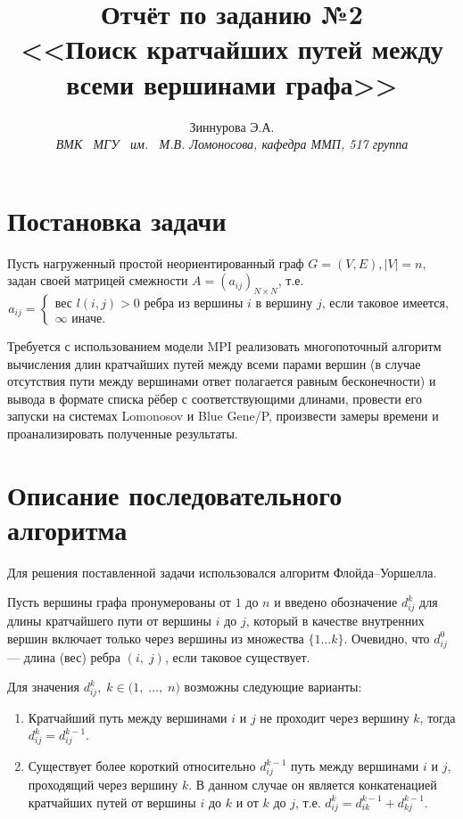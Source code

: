 \documentclass[a4paper,12pt]{report}
\begin{document}
\title{Отчёт по заданию №2 \\ <<Поиск кратчайших путей между всеми вершинами графа>>}
\author{Зиннурова Э.А. \\ \textit{ВМК \, МГУ \, им. \, М.В. Ломоносова, кафедра ММП, 517 группа}}

\maketitle

\section*{Постановка задачи}
	\par Пусть нагруженный простой неориентированный граф $G=(V, E), |V| = n,$ задан своей матрицей смежности $A = (a_{ij})_{N \times N}$, т.е. 
	$$a_{ij} = \begin{cases}
		\text{вес $l(i,j) > 0$ ребра из вершины $i$ в вершину $j$, если таковое имеется},\\
		\infty \text{ иначе}.
		\end{cases}
$$
	\par Требуется с использованием модели MPI реализовать многопоточный алгоритм вычисления длин кратчайших путей между всеми парами вершин (в случае отсутствия пути между вершинами ответ полагается равным бесконечности) и вывода в формате списка рёбер с соответствующими длинами, провести его запуски на системах Lomonosov и Blue Gene/P, произвести замеры времени и проанализировать полученные результаты.
	
\section*{Описание последовательного алгоритма}
	\par Для решения поставленной задачи использовался алгоритм Флойда--Уоршелла.
	\par Пусть вершины графа пронумерованы от $1$ до $n$ и введено обозначение $d_{i j}^{k}$ для длины кратчайшего пути от вершины $i$ до $j$, который в качестве внутренних вершин включает только через вершины из множества $\{1 \ldots k\}$. Очевидно, что $d_{i j}^{0}$ — длина (вес) ребра $(i,\;j)$, если таковое существует.
	\par Для значения $d_{i j}^{k},\;k \in \mathbb (1,\;\ldots,\;n)$ возможны следующие варианты:
	\begin{enumerate}
	\item
	Кратчайший путь между вершинами $i$ и $j$ не проходит через вершину $k$, тогда $d_{i j}^{k}=d_{i j}^{k-1}$.
	\item
	Существует более короткий относительно $d_{ij}^{k-1}$ путь между вершинами $i$ и $j$, проходящий через вершину $k$. В данном случае он является конкатенацией кратчайших путей от вершины $i$ до $k$ и от $k$ до $j$, т.е. $d_{i j}^{k}=d_{i k}^{k-1} + d_{k j}^{k-1}.$
	\end{enumerate}
\end{document}
